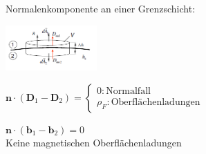 \documentclass[english]{latex4ei/latex4ei_sheet}
\begin{document}
\begin{sectionbox}
    Normalenkomponente an einer Grenzschicht:\\
    \vspace{-0.28cm}
    \begin{center}\includegraphics[width = 3.5cm]{./img/normal_rand.png}\end{center}
    \begin{emphbox}
        $\mathbf{n} \cdot (\mathbf{D}_1 - \mathbf{D}_2) = \begin{cases}
                0 : \text{Normalfall} \\
                \rho_F: \text{Oberflächenladungen}
            \end{cases} $
    \end{emphbox}

    \begin{emphbox}
        $\mathbf{n} \cdot (\mathbf{b}_1 - \mathbf{b}_2) = 0$\\
        Keine magnetischen Oberflächenladungen
    \end{emphbox}
\end{sectionbox}
\end{document}
